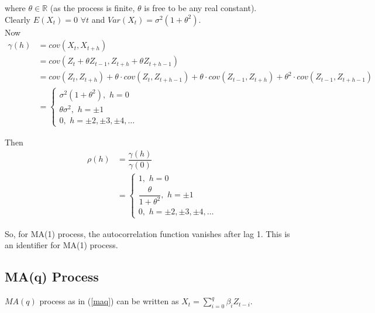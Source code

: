 \documentclass[11pt, a4paper]{article}
\begin{document}
where $\theta \in \mathbb{R}$ (as the process is finite, $\theta$ is free to be any real constant).\\


Clearly $E(X_t) = 0$ $\forall t$ and $Var(X_t) = \sigma^2 (1 + \theta^2)$. \\[0.25em]

Now 
\begin{align*}
\gamma(h) &= cov(X_t, X_{t+h}) \\[0.25em]
&= cov(Z_t + \theta Z_{t-1}, Z_{t+h} + \theta Z_{t+h-1}) \\[0.25em]
&= cov(Z_t, Z_{t+h}) + \theta \cdot cov(Z_t, Z_{t+h-1}) + \theta \cdot  cov(Z_{t-1}, Z_{t+h}) + \theta^2 \cdot cov(Z_{t-1}, Z_{t+h-1}) \\[0.25em]
&= \begin{cases}
\sigma^2 (1 + \theta^2), \,\, h = 0 \\[0.25em]
\theta \sigma^2 , \,\, h = \pm 1 \\[0.25em]
0, \,\, h = \pm 2, \pm 3, \pm 4, \ldots
\end{cases}
\end{align*}

Then
\begin{align*}
\rho(h) &= \dfrac{\gamma(h)}{\gamma(0)} \\[0.35em]
&= \begin{cases}
1, \,\, h = 0 \\[0.25em]
\dfrac{\theta}{1 + \theta^2}, \,\, h = \pm 1 \\[0.5em]
0, \,\, h = \pm 2, \pm 3, \pm 4, \ldots
\end{cases}
\end{align*}

\smallpencil \hspace{0.1cm} So, for MA(1) process, the autocorrelation function vanishes after lag 1. This is an identifier for MA(1) process.

\subsection{MA(q) Process}

$MA(q)$ process as in (\ref{maq}) can be written as $X_t = \sum \limits_{i = 0}^{q} \beta_i Z_{t-i}$. \\[0.25em]
\end{document}
